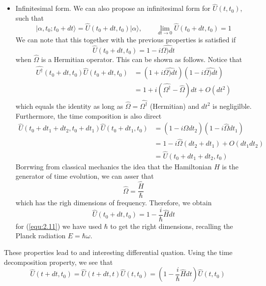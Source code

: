 \begin{itemize}
  \item Infinitesimal form. We can also propose an
    infinitesimal form for $\hat{U}(t,t_0)$, such that
    \begin{equation}
      \vert \alpha,t_0;t_0 + dt\rangle  = \hat{U}(t_0+dt,t_0) \vert \alpha\rangle ,
      \qquad \lim_{dt \to 0} \hat{U}(t_0+dt,t_0) = 1
      \label{equ:2.9}
    \end{equation}
    We can note that this together with the previous
    properties is satisfied if
    \begin{equation}
      \hat{U}(t_0+dt,t_0) = 1- i\hat{\Omega)dt}
      \label{equ:2.10}
    \end{equation}
    when $\hat{\Omega}$ is a Hermitian operator.
    This can be shown as follows. Notice that
    \begin{align*}
      \hat{U^\dagger} (t_0+dt,t_0) \hat{U}(t_0+dt,t_0) &= 
      (1+ i\hat{\Omega)dt})(1- i\hat{\Omega)dt})\\
      &=
      1+i(\hat{\Omega^\dagger}-\hat{\Omega})dt + O(dt^2)
    \end{align*}
    which equals the identity as long as $\hat{\Omega} =
    \hat{\Omega^\dagger}$ (Hermitian) and $dt^2$ is
    negligilble. Furthermore, the time composition is also
    direct
    \begin{align*}
      \hat{U}(t_0+dt_1+dt_2,t_0+dt_1)\hat{U}(t_0+dt_1,t_0)
      &= (1-i\hat{\Omega}dt_2)(1-i\hat{\Omega}dt_1) \\
      &= 1-i\hat{\Omega}(dt_2+dt_1) + O(dt_1dt_2)\\
      &= \hat{U}(t_0+dt_1+dt_2,t_0)
    \end{align*}
    Borrwing from classical mechanics the idea that the
    Hamiltonian $H$ is the generator of time evolution, we
    can asser that
    \begin{equation}
      \hat{\Omega} = \frac{\hat{H}}{\hbar}
      \label{equ:2.11}
    \end{equation}
    which has the righ dimensions of frequency. Therefore,
    we obtain
    \begin{equation}
      \hat{U}(t_0+dt,t_0) = 1 -\frac{i}{\hbar}\hat{H}dt
      \label{equ:2.12}
    \end{equation}
    for (\ref{equ:2.11}) we have used $\hbar$ to get the
    right dimensions, recalling the Planck radiation $E =
    \hbar \omega$.
\end{itemize}
These properties lead to and interesting differential
quation. Using the time decomposition property, we see that
\begin{equation}
  \hat{U}(t+dt,t_0) = \hat{U}(t+dt,t) \hat{U}(t,t_0) =
  (1-\frac{i}{\hbar}\hat{H}dt)\hat{U}(t,t_0)
  \label{equ:2.13}
\end{equation}
